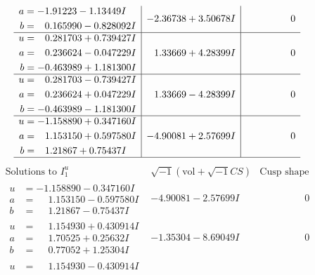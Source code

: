 \documentclass[1p]{elsarticle_modified}
\theoremstyle{definition}
\newcommand{\I}{\sqrt{-1}}
\begin{document}
$$\begin{array}{c|c|c}
\begin{aligned}
a &= -1.91223 - 1.13449 I \\
b &= \phantom{-}0.165990 - 0.828092 I\end{aligned}
 & -2.36738 + 3.50678 I & \phantom{-0.000000 } 0 \\ \hline\begin{aligned}
u &= \phantom{-}0.281703 + 0.739427 I \\
a &= \phantom{-}0.236624 - 0.047229 I \\
b &= -0.463989 + 1.181300 I\end{aligned}
 & \phantom{-}1.33669 + 4.28399 I & \phantom{-0.000000 } 0 \\ \hline\begin{aligned}
u &= \phantom{-}0.281703 - 0.739427 I \\
a &= \phantom{-}0.236624 + 0.047229 I \\
b &= -0.463989 - 1.181300 I\end{aligned}
 & \phantom{-}1.33669 - 4.28399 I & \phantom{-0.000000 } 0 \\ \hline\begin{aligned}
u &= -1.158890 + 0.347160 I \\
a &= \phantom{-}1.153150 + 0.597580 I \\
b &= \phantom{-}1.21867 + 0.75437 I\end{aligned}
 & -4.90081 + 2.57699 I & \phantom{-0.000000 } 0\\
 \hline 
 \end{array}$$\newpage$$\begin{array}{c|c|c}  
\text{Solutions to }I^u_{1}& \I (\text{vol} + \sqrt{-1}CS) & \text{Cusp shape}\\
 \hline 
\begin{aligned}
u &= -1.158890 - 0.347160 I \\
a &= \phantom{-}1.153150 - 0.597580 I \\
b &= \phantom{-}1.21867 - 0.75437 I\end{aligned}
 & -4.90081 - 2.57699 I & \phantom{-0.000000 } 0 \\ \hline\begin{aligned}
u &= \phantom{-}1.154930 + 0.430914 I \\
a &= \phantom{-}1.70525 + 0.25632 I \\
b &= \phantom{-}0.77052 + 1.25304 I\end{aligned}
 & -1.35304 - 8.69049 I & \phantom{-0.000000 } 0 \\ \hline\begin{aligned}
u &= \phantom{-}1.154930 - 0.430914 I \\

\end{aligned}
\end{array}$$
\end{document}
